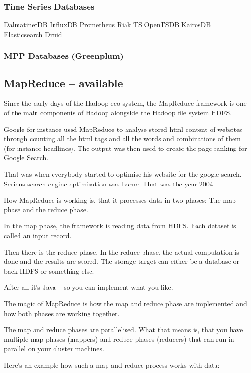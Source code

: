 \documentclass[12pt]{scrartcl} %
\begin{document}
\subsubsection{Time Series Databases}
DalmatinerDB
InfluxDB
Prometheus
Riak TS
OpenTSDB
KairosDB
Elasticsearch
Druid
\subsubsection{MPP Databases (Greenplum)}



\subsection{MapReduce -- available}

Since the early days of the Hadoop eco system, the MapReduce framework is one of the main components of Hadoop alongside the Hadoop file system HDFS.

Google for instance used MapReduce to analyse stored html content of websites through counting all the html tags and all the words and combinations of them (for instance headlines). The output was then used to create the page ranking for Google Search.

That was when everybody started to optimise his website for the google search. Serious search engine optimisation was borne. That was the year 2004.

How MapReduce is working is, that it processes data in two phases: The map phase and the reduce phase.

In the map phase, the framework is reading data from HDFS. Each dataset is called an input record.

Then there is the reduce phase. In the reduce phase, the actual computation is done and the results are stored. The storage target can either be a database or back HDFS or something else.

After all it’s Java – so you can implement what you like.

The magic of MapReduce is how the map and reduce phase are implemented and how both phases are working together.

The map and reduce phases are parallelised. What that means is, that you have multiple map phases (mappers) and reduce phases (reducers) that can run in parallel on your cluster machines.

Here's an example how such a map and reduce process works with data:
\end{document}

